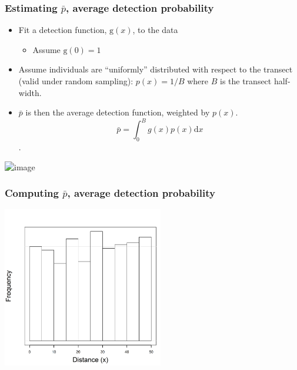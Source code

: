 \documentclass[color=usenames,dvipsnames,handout]{beamer}\usepackage[]{graphicx}\usepackage[]{xcolor}
\begin{document}
\begin{frame}
  \frametitle{Estimating $\bar{p}$, average detection probability}
  \begin{itemize}
    \normalsize
    \item<1-> Fit a detection function, $\mathrm{g}(x)$, to the data
      \begin{itemize}
        \item Assume $\mathrm{g}(0) = 1$
      \end{itemize}
    \item<2-> Assume individuals are ``uniformly'' distributed with
      respect to the transect (valid under random sampling): $p(x) =
      1/B$ where $B$ is the transect half-width.
    \item<3-> $\bar{p}$ is then the
      average detection function, weighted by $p(x)$. $$\bar{p} =
      \int_0^B g(x)p(x) \mathrm{d} x$$.  
    \end{itemize}
    \includegraphics<1->[width=\textwidth]{figs/detfuns}
\end{frame}






\begin{frame}
  \frametitle{Computing $\bar{p}$, average detection probability}
\begin{center}
  \includegraphics[width=7cm]{figs/detfun0-0}
\end{center}
\end{frame}
\end{document}
